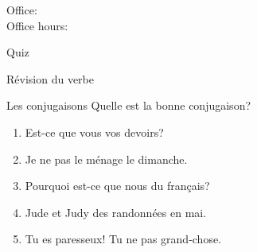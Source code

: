 \documentclass{beamer}
\subtitle[Loisirs faits et \lexi{faire}]{Les loisirs que nous faisons et le verbe \lexi{faire}}
\begin{document}
  \begin{frame}
    \titlepage
    \tiny{Office: \\
          Office hours: }
  \end{frame}

  \begin{frame}{}
    \begin{center}
      \Large Quiz
    \end{center}
  \end{frame}

  \begin{frame}{Révision du verbe  }
    \begin{center}
      
    \end{center}
  \end{frame}

  \begin{frame}{Les conjugaisons}
    Quelle est la bonne conjugaison? \\
    \begin{enumerate}
      \item Est-ce que vous \underline{} vos devoirs?
      \item Je ne \underline{} pas le ménage le dimanche.
      \item Pourquoi est-ce que nous \underline{} du français?
      \item Jude et Judy \underline{} des randonnées en mai.
      \item Tu es paresseux! Tu ne \underline{} pas grand-chose.
    \end{enumerate}
  \end{frame}
\end{document}

